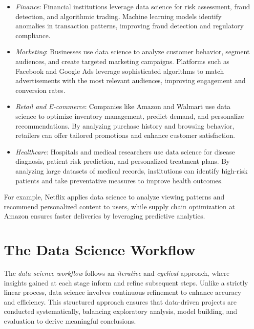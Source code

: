\documentclass[
]{book}
\providecommand{\tightlist}{%
  \setlength{\itemsep}{0pt}\setlength{\parskip}{0pt}}
\theoremstyle{definition}
\theoremstyle{definition}
\theoremstyle{definition}
\theoremstyle{definition}
\theoremstyle{remark}
\begin{document}
\begin{itemize}
\tightlist
\item
  \emph{Finance}: Financial institutions leverage data science for risk assessment, fraud detection, and algorithmic trading. Machine learning models identify anomalies in transaction patterns, improving fraud detection and regulatory compliance.\\
\item
  \emph{Marketing}: Businesses use data science to analyze customer behavior, segment audiences, and create targeted marketing campaigns. Platforms such as Facebook and Google Ads leverage sophisticated algorithms to match advertisements with the most relevant audiences, improving engagement and conversion rates.\\
\item
  \emph{Retail and E-commerce}: Companies like Amazon and Walmart use data science to optimize inventory management, predict demand, and personalize recommendations. By analyzing purchase history and browsing behavior, retailers can offer tailored promotions and enhance customer satisfaction.\\
\item
  \emph{Healthcare}: Hospitals and medical researchers use data science for disease diagnosis, patient risk prediction, and personalized treatment plans. By analyzing large datasets of medical records, institutions can identify high-risk patients and take preventative measures to improve health outcomes.
\end{itemize}

For example, Netflix applies data science to analyze viewing patterns and recommend personalized content to users, while supply chain optimization at Amazon ensures faster deliveries by leveraging predictive analytics.

\section{The Data Science Workflow}\label{the-data-science-workflow}

The \emph{data science workflow} follows an \emph{iterative} and \emph{cyclical} approach, where insights gained at each stage inform and refine subsequent steps. Unlike a strictly linear process, data science involves continuous refinement to enhance accuracy and efficiency. This structured approach ensures that data-driven projects are conducted systematically, balancing exploratory analysis, model building, and evaluation to derive meaningful conclusions.
\end{document}

